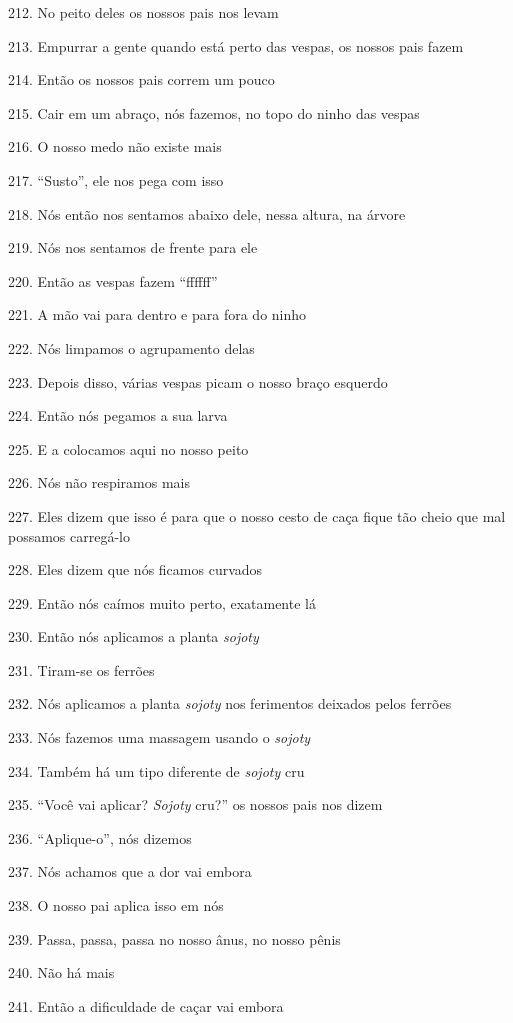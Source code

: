 212. No peito deles os nossos pais nos levam

213. Empurrar a gente quando está perto das vespas, os nossos pais fazem

214. Então os nossos pais correm um pouco

215. Cair em um abraço, nós fazemos, no topo do ninho das vespas

216. O nosso medo não existe mais

217. ``Susto'', ele nos pega com isso

218. Nós então nos sentamos abaixo dele, nessa altura, na árvore

219. Nós nos sentamos de frente para ele

220. Então as vespas fazem ``ffffff''

221. A mão vai para dentro e para fora do ninho

222. Nós limpamos o agrupamento delas

223. Depois disso, várias vespas picam o nosso braço esquerdo

224. Então nós pegamos a sua larva

225. E a colocamos aqui no nosso peito

226. Nós não respiramos mais

227. Eles dizem que isso é para que o nosso cesto de caça fique tão cheio
que mal possamos carregá-lo

228. Eles dizem que nós ficamos curvados

229. Então nós caímos muito perto, exatamente lá

230. Então nós aplicamos a planta \emph{sojoty}

231. Tiram-se os ferrões

232. Nós aplicamos a planta \emph{sojoty} nos ferimentos deixados pelos
ferrões

233. Nós fazemos uma massagem usando o \emph{sojoty}

234. Também há um tipo diferente de \emph{sojoty} cru

235. ``Você vai aplicar? \emph{Sojoty} cru?'' os nossos pais nos dizem

236. ``Aplique-o'', nós dizemos

237. Nós achamos que a dor vai embora

238. O nosso pai aplica isso em nós

239. Passa, passa, passa no nosso ânus, no nosso pênis

240. Não há mais

241. Então a dificuldade de caçar vai embora

